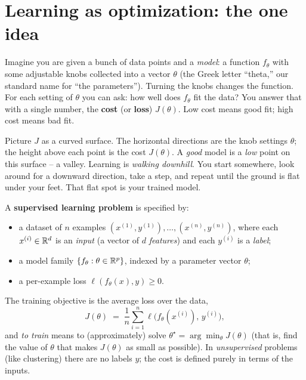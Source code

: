 \section{Learning as optimization: the one idea}
\label{ch36:learning-as-optimization}

Imagine you are given a bunch of data points and a \emph{model}: a function
$f_\theta$ with some adjustable knobs collected into a vector $\theta$ (the
Greek letter ``theta,'' our standard name for ``the parameters''). Turning the
knobs changes the function. For each setting of $\theta$ you can ask: how well
does $f_\theta$ fit the data? You answer that with a single number, the
\textbf{cost} (or \textbf{loss}) $J(\theta)$. Low cost means good fit; high cost
means bad fit.

\begin{intuitionbox}
Picture $J$ as a curved surface. The horizontal directions are the knob settings
$\theta$; the height above each point is the cost $J(\theta)$. A \emph{good}
model is a \emph{low} point on this surface -- a valley. Learning is
\emph{walking downhill}. You start somewhere, look around for a downward
direction, take a step, and repeat until the ground is flat under your feet.
That flat spot is your trained model.
\end{intuitionbox}

\begin{formalbox}
A \textbf{supervised learning problem} is specified by:
\begin{itemize}
  \item a dataset of $n$ examples $(x^{(1)},y^{(1)}),\dots,(x^{(n)},y^{(n)})$,
        where each $x^{(i)}\in\mathbb{R}^d$ is an \emph{input} (a vector of $d$
        \emph{features}) and each $y^{(i)}$ is a \emph{label};
  \item a model family $\{f_\theta : \theta\in\mathbb{R}^p\}$, indexed by a parameter
        vector $\theta$;
  \item a per-example loss $\ell(f_\theta(x), y)\ge 0$.
\end{itemize}
The training objective is the average loss over the data,
\[
  J(\theta) \;=\; \frac{1}{n}\sum_{i=1}^{n} \ell\!\big(f_\theta(x^{(i)}),\, y^{(i)}\big),
\]
and \emph{to train} means to (approximately) solve
$\theta^\star = \arg\min_{\theta} J(\theta)$ (that is, find the value of $\theta$ that makes $J(\theta)$ as small as possible).
In \emph{unsupervised} problems (like clustering) there are no labels $y$; the
cost is defined purely in terms of the inputs.
\end{formalbox}

